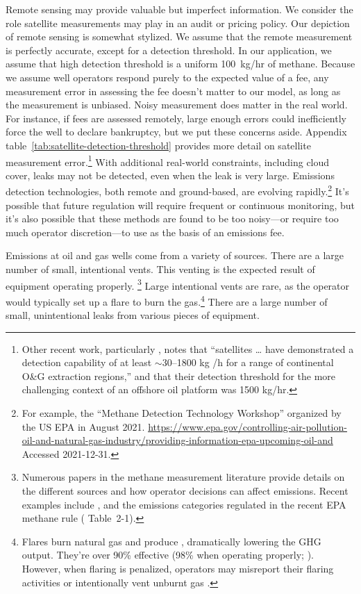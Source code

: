 \documentclass[12pt,oneside,letterpaper]{article}
\theoremstyle{definition}
\begin{document}
\begin{refsection}
Remote sensing may provide valuable but imperfect information.
We consider the role satellite measurements may play in an audit or pricing policy.
Our depiction of remote sensing is somewhat stylized.
We assume that the remote measurement is perfectly accurate, except for a detection threshold.
In our application, we assume that high detection threshold is a uniform 100~kg/hr of methane.
Because we assume well operators respond purely to the expected value of a fee, any  measurement error in assessing the fee doesn't matter to our model, as long as the measurement is unbiased.
Noisy measurement does matter in the real world.
For instance, if fees are assessed remotely, large enough errors could inefficiently force the well to declare bankruptcy, but we put these concerns aside.
Appendix table~\ref{tab:satellite-detection-threshold} provides more detail on satellite measurement error.\footnote{%
Other recent work, particularly
\textcite{IrakulisLoitxate/Gorrono/ZavalaAraiza/Guanter:2022},
notes that ``satellites \ldots{} have demonstrated a detection capability of at least \(\sim\)30--1800 kg /h for a range of continental O\&G extraction regions,'' and that their detection threshold for the more challenging context of an offshore oil platform was 1500 kg/hr.
}
With additional real-world constraints, including cloud cover, leaks may not be detected, even when the leak is very large.
Emissions detection technologies, both remote and ground-based, are evolving rapidly.\footnote{%
For example, the ``Methane Detection Technology Workshop'' organized by the US EPA in August 2021.
\url{https://www.epa.gov/controlling-air-pollution-oil-and-natural-gas-industry/providing-information-epa-upcoming-oil-and}
Accessed 2021-12-31.
}
It's possible that future regulation will require frequent or continuous monitoring, but it's also possible that these methods are found to be too noisy---or require too much operator discretion---to use as the basis of an emissions fee.

Emissions at oil and gas wells come from a variety of sources.
There are a large number of small, intentional vents.
This venting is the expected result of equipment operating properly.%
\footnote{%
Numerous papers in the methane measurement literature provide details on the different sources and how operator decisions can affect emissions.
Recent examples include \textcite{Wang/Barlow/Funk/Robinson/Brandt/Ravikumar:2021}, and the emissions categories regulated in the recent EPA methane rule (\cite{EPA-methane-rule-RIA-2023} Table~2-1).
}
Large intentional vents are rare, as the operator would typically set up a flare to burn the gas.\footnote{%
Flares burn natural gas and produce , dramatically lowering the \gls{GHG} output.
They're over 90\% effective (98\% when operating properly; \cite{Plant/etal:2022}).
However, when flaring is penalized, operators may misreport their flaring activities
\parencite{Lau:2021}
or intentionally vent unburnt gas
\parencite{Calel/Mahdavi:2020}.
}
There are a large number of small, unintentional leaks from various pieces of equipment.


\end{refsection}
\end{document}
